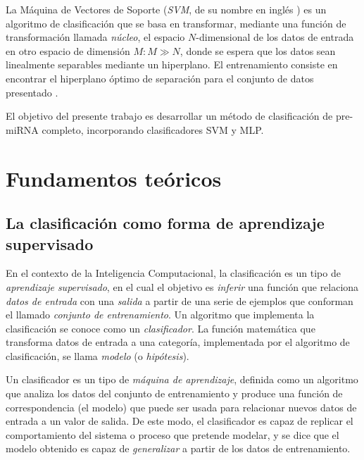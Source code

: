 \documentclass[12pt,bibliography=oldstyle,DIV=12,parskip=half-]{scrreprt}
\newcommand{\e}{\emph}
\begin{document}
La Máquina de Vectores de Soporte (\emph{SVM}, de su nombre en inglés
) es un algoritmo de clasificación que se
basa en transformar, mediante una función de transformación llamada
\emph{núcleo}, el espacio $N$-dimensional de los datos de entrada en
otro espacio de dimensión $M: M\gg N$, donde se espera que los datos
sean linealmente separables mediante un hiperplano. El entrenamiento
consiste en encontrar el hiperplano óptimo de separación para el
conjunto de datos presentado \cite{bottou}.

El objetivo del presente trabajo es desarrollar un método de
clasificación de pre-miRNA completo, incorporando clasificadores SVM y
MLP.
%
%
%
%
%
%
%
%
%
%
%
%
%
%
%
%
%
%
%
%
%
%
%
%
%
%
%
%
%
%
\chapter{Fundamentos teóricos}
%
%
%
%
\section{La clasificación como forma de aprendizaje supervisado}
%
%
En el contexto de la Inteligencia Computacional, la clasificación es
un tipo de \e{aprendizaje supervisado}, en el cual el objetivo es
\e{inferir} una función que relaciona \e{datos de entrada} con una
\e{salida} a partir de una serie de ejemplos que conforman el llamado
\e{conjunto de entrenamiento}.  Un algoritmo que implementa la
clasificación se conoce como un \e{clasificador}. La función
matemática que transforma datos de entrada a una categoría,
implementada por el algoritmo de clasificación, se llama \e{modelo} (o
\e{hipótesis}).

Un clasificador es un tipo de \e{máquina de aprendizaje}, definida
como un algoritmo que analiza los datos del conjunto de entrenamiento
y produce una función de correspondencia (el modelo) que puede ser
usada para relacionar nuevos datos de entrada a un valor de salida.
De este modo, el clasificador es capaz de replicar el comportamiento
del sistema o proceso que pretende modelar, y se dice que el modelo
obtenido es capaz de \e{generalizar} a partir de los datos de
entrenamiento.
%
\end{document}
